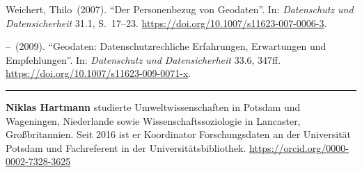 \documentclass[a4paper,
fontsize=11pt,
oneside,
numbers=noperiodatend,
parskip=half-,
bibliography=totoc,
final
]{scrartcl}
\begin{document}
Weichert, Thilo~(2007). \enquote{Der Personenbezug von Geodaten}. In:
\emph{Datenschutz und Datensicherheit} 31.1, S.~17--23.
\url{https://doi.org/10.1007/s11623-007-0006-3}.

--~(2009). \enquote{Geodaten: Datenschutzrechliche Erfahrungen,
Erwartungen und Empfehlungen}. In: \emph{Datenschutz und
Datensicherheit} 33.6, 347ff.
\url{https://doi.org/10.1007/s11623-009-0071-x}.

\begin{center}\rule{0.5\linewidth}{0.5pt}\end{center}

\textbf{Niklas Hartmann} studierte Umweltwissenschaften in Potsdam und
Wageningen, Niederlande sowie Wissenschaftssoziologie in Lancaster,
Großbritannien. Seit 2016 ist er Koordinator Forschungsdaten an der
Universität Potsdam und Fachreferent in der Universitätsbibliothek. \url{https://orcid.org/0000-0002-7328-3625}
\end{document}
